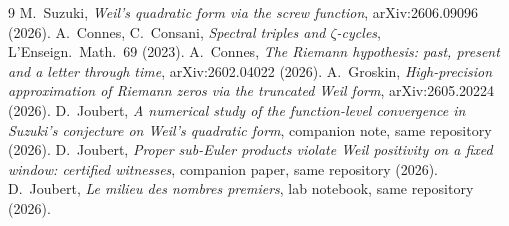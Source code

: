\documentclass[10pt]{article}
\begin{document}
\begin{thebibliography}{9}\small
{} M.~Suzuki, \emph{Weil's quadratic form via the screw
function}, arXiv:2606.09096 (2026).
 A.~Connes, C.~Consani, \emph{Spectral triples and
$\zeta$-cycles}, L'Enseign.\ Math.\ 69 (2023).
 A.~Connes, \emph{The Riemann hypothesis: past, present and
a letter through time}, arXiv:2602.04022 (2026).
 A.~Groskin, \emph{High-precision approximation of Riemann
zeros via the truncated Weil form}, arXiv:2605.20224 (2026).
 D.~Joubert, \emph{A numerical study of the function-level
convergence in Suzuki's conjecture on Weil's quadratic form}, companion
note, same repository (2026).
 D.~Joubert, \emph{Proper sub-Euler products violate
Weil positivity on a fixed window: certified witnesses}, companion
paper, same repository (2026).
 D.~Joubert, \emph{Le milieu des nombres premiers}, lab
notebook, same repository (2026).
\end{thebibliography}
\end{document}
